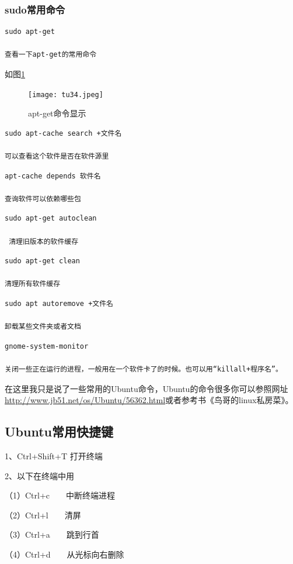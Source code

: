 \documentclass{article}
\begin{document}
\subsubsection{sudo常用命令}
\begin{lstlisting}
sudo apt-get

查看一下apt-get的常用命令
\end{lstlisting}
如图\ref{tu34}
\begin{figure}[!htb] %
\centering
\texttt{[image: tu34.jpeg]}
\caption{\small apt-get命令显示}
\label{tu34}
\end{figure} 
\begin{lstlisting}
sudo apt-cache search +文件名

可以查看这个软件是否在软件源里
\end{lstlisting}
\begin{lstlisting}
apt-cache depends 软件名

查询软件可以依赖哪些包
\end{lstlisting}
\begin{lstlisting}
sudo apt-get autoclean

 清理旧版本的软件缓存
\end{lstlisting}
\begin{lstlisting}
sudo apt-get clean

清理所有软件缓存
\end{lstlisting}
\begin{lstlisting}
sudo apt autoremove +文件名

卸载某些文件夹或者文档
\end{lstlisting}
\begin{lstlisting}
gnome-system-monitor

关闭一些正在运行的进程，一般用在一个软件卡了的时候。也可以用“killall+程序名”。
\end{lstlisting}
在这里我只是说了一些常用的Ubuntu命令，Ubuntu的命令很多你可以参照网址\url{http://www.jb51.net/os/Ubuntu/56362.html}或者参考书{\color{red}《鸟哥的linux私房菜》}。
\subsection{Ubuntu常用快捷键}
1、Ctrl+Shift+T 打开终端

2、以下在终端中用

  （1）Ctrl+c~~~~中断终端进程

  （2）Ctrl+l~~~~清屏

 （3）Ctrl+a~~~~跳到行首

 （4）Ctrl+d~~~~从光标向右删除
\end{document}
